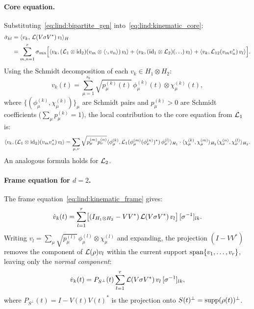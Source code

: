 \paragraph{Core equation.}
Substituting~\eqref{eq:lind:bipartite_gen} into~\eqref{eq:lind:kinematic_core}:
\begin{equation}
\label{eq:lind:bipartite_core}
\begin{aligned}
    \dot\sigma_{kl}
    &= \langle v_k,\, \mathcal{L}(V\sigma V^*)\, v_l \rangle_H \\
    &= \sum_{m,n=1}^r \sigma_{mn}
       \Bigl[
         \langle v_k, (\mathcal{L}_1 \otimes \mathrm{id}_{2})(v_m \otimes \langle\cdot, v_n\rangle)\, v_l\rangle
         + \langle v_k, (\mathrm{id}_{1} \otimes \mathcal{L}_2)(\ldots)\, v_l\rangle
         + \langle v_k, \mathcal{L}_{12}(v_m v_n^*)\, v_l\rangle
       \Bigr].
\end{aligned}
\end{equation}
Using the Schmidt decomposition of each $v_k \in H_1 \otimes H_2$:
\begin{equation}
\label{eq:lind:bipartite_schmidt}
    v_k(t) = \sum_{\mu=1}^{s_k} \sqrt{p_\mu^{(k)}(t)}\,
    \phi_\mu^{(k)}(t) \otimes \chi_\mu^{(k)}(t),
\end{equation}
where $\{(\phi_\mu^{(k)}, \chi_\mu^{(k)})\}_\mu$ are Schmidt pairs and
$p_\mu^{(k)} > 0$ are Schmidt coefficients ($\sum_\mu p_\mu^{(k)} = 1$),
the local contribution to the core equation from $\mathcal{L}_1$ is:
\begin{equation}
\label{eq:lind:bipartite_local1}
    \langle v_k, (\mathcal{L}_1 \otimes \mathrm{id}_{2})(v_m v_n^*)\, v_l\rangle
    = \sum_{\mu,\nu} \sqrt{p_\mu^{(m)} p_\nu^{(n)}}
      \langle \phi_\mu^{(k)}, \mathcal{L}_1(\phi_\mu^{(m)} (\phi_\nu^{(n)})^*)\,
      \phi_\nu^{(l)}\rangle_{H_1}
      \cdot \langle \chi_\mu^{(k)}, \chi_\mu^{(m)}\rangle_{H_2}
      \langle \chi_\nu^{(n)}, \chi_\nu^{(l)}\rangle_{H_2}.
\end{equation}
An analogous formula holds for $\mathcal{L}_2$.

\paragraph{Frame equation for $d=2$.}
The frame equation~\eqref{eq:lind:kinematic_frame} gives:
\begin{equation}
\label{eq:lind:bipartite_frame}
    \dot{v}_k(t)
    = \sum_{l=1}^r \bigl[(I_{H_1 \otimes H_2} - VV^*)\,
      \mathcal{L}(V\sigma V^*)\, v_l\bigr]\,
      [\sigma^{-1}]_{lk}.
\end{equation}
Writing $v_l = \sum_\mu \sqrt{p_\mu^{(l)}}\, \phi_\mu^{(l)} \otimes
\chi_\mu^{(l)}$ and expanding, the projection $(I - VV^*)$ removes
the component of $\mathcal{L}(\rho) v_l$ within the current support
$\mathrm{span}\{v_1, \ldots, v_r\}$, leaving only the \emph{normal component}:
\begin{equation}
    \dot{v}_k(t)
    = P_{S^\perp}(t)
      \sum_{l=1}^r \mathcal{L}(V\sigma V^*)\, v_l\, [\sigma^{-1}]_{lk},
\end{equation}
where $P_{S^\perp}(t) = I - V(t)V(t)^*$ is the projection onto
$S(t)^\perp = \mathrm{supp}(\rho(t))^\perp$.

